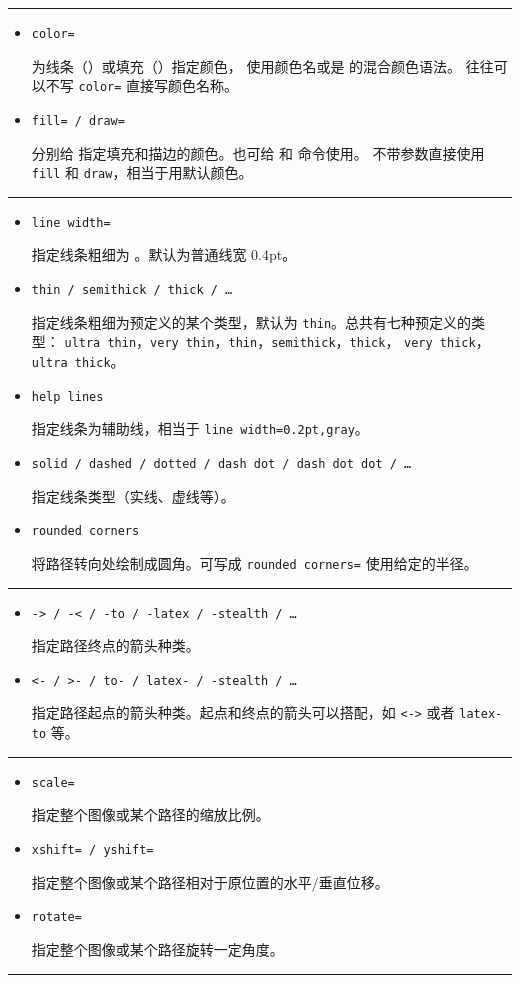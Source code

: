 \begin{table}[htp]
\caption{\TikZ\ 常用的一些绘图参数。}\label{tbl:tikz-options}
\small
\hrule
\begin{itemize}
  \item \texttt{color=} \par
  为线条（）或填充（）指定颜色， 使用颜色名或是  的混合颜色语法。
  往往可以不写 \texttt{color=} 直接写颜色名称。
  \item \texttt{fill= / draw=} \par
  分别给  指定填充和描边的颜色。也可给  和  命令使用。
  不带参数直接使用 \texttt{fill} 和 \texttt{draw}，相当于用默认颜色。
\end{itemize}
\hrule
\begin{itemize}
  \item \texttt{line width=} \par
  指定线条粗细为 。默认为普通线宽 0.4pt。
  \item \texttt{thin / semithick / thick / \ldots} \par
  指定线条粗细为预定义的某个类型，默认为 \texttt{thin}。总共有七种预定义的类型：
  \texttt{ultra thin}，\texttt{very thin}，\texttt{thin}，\texttt{semithick}，\texttt{thick}，
  \texttt{very thick}，\texttt{ultra thick}。
  \item \texttt{help lines} \par
  指定线条为辅助线，相当于 \texttt{line width=0.2pt,gray}。
  \item \texttt{solid / dashed / dotted / dash dot / dash dot dot / \dots} \par
  指定线条类型（实线、虚线等）。
  \item \texttt{rounded corners} \par
  将路径转向处绘制成圆角。可写成 \texttt{rounded corners=} 使用给定的半径。
\end{itemize}
\hrule
\begin{itemize}
  \item \texttt{-> / -< / -to / -latex / -stealth / \ldots} \par
  指定路径终点的箭头种类。
  \item \texttt{<- / >- / to- / latex- / -stealth / \ldots} \par
  指定路径起点的箭头种类。起点和终点的箭头可以搭配，如 \texttt{<->} 或者 \texttt{latex-to} 等。
\end{itemize}
\hrule
\begin{itemize}
  \item \texttt{scale=} \par
  指定整个图像或某个路径的缩放比例。
  \item \texttt{xshift= / yshift=} \par
  指定整个图像或某个路径相对于原位置的水平/垂直位移。
  \item \texttt{rotate=} \par
  指定整个图像或某个路径旋转一定角度。
\end{itemize}
\hrule
\end{table}

